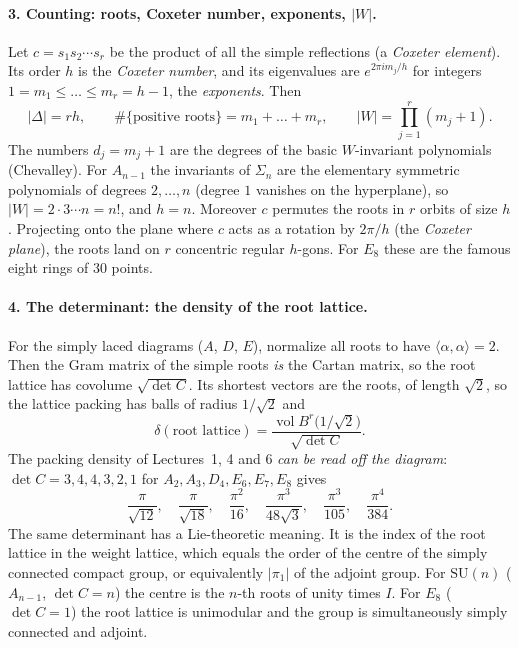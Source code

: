 \documentclass[11pt,openany]{book}
\theoremstyle{plain}
\theoremstyle{definition}
\theoremstyle{remark}
\newcommand{\vol}{\operatorname{vol}}
\newcommand{\abs}[1]{\left\lvert #1 \right\rvert}
\newcommand{\ip}[2]{\langle #1, #2\rangle}
\newcommand{\dens}{\delta}             %
\newcommand{\Ball}{B}                  %
\begin{document}
\paragraph{3. Counting: roots, Coxeter number, exponents, $\abs{W}$.} Let $c=s_1s_2\cdots s_r$ be the
product of all the simple reflections (a \emph{Coxeter element}). Its order $h$ is the \emph{Coxeter
number}, and its eigenvalues are $e^{2\pi im_j/h}$ for integers $1=m_1\le\dots\le m_r=h-1$, the
\emph{exponents}. Then
\[
  \abs{\Delta}=rh,\qquad \#\{\text{positive roots}\}=m_1+\dots+m_r,\qquad
  \abs{W}=\prod_{j=1}^r(m_j+1).
\]
The numbers $d_j=m_j+1$ are the degrees of the basic $W$-invariant polynomials (Chevalley). For
$A_{n-1}$ the invariants of $\Sigma_n$ are the elementary symmetric polynomials of degrees $2,\dots,n$
(degree $1$ vanishes on the hyperplane), so $\abs{W}=2\cdot3\cdots n=n!$, and $h=n$. Moreover $c$
permutes the roots in $r$ orbits of size $h$. Projecting onto the plane where $c$ acts as a rotation
by $2\pi/h$ (the \emph{Coxeter plane}), the roots land on $r$ concentric regular $h$-gons. For $E_8$
these are the famous eight rings of $30$ points.

\paragraph{4. The determinant: the density of the root lattice.} For the simply laced diagrams
($A$, $D$, $E$), normalize all roots to have $\ip{\alpha}{\alpha}=2$. Then the Gram matrix of the simple
roots \emph{is} the Cartan matrix, so the root lattice has covolume $\sqrt{\det C}$. Its shortest
vectors are the roots, of length $\sqrt2$, so the lattice packing has balls of radius $1/\sqrt2$ and
\[
  \dens(\text{root lattice})=\frac{\vol\Ball^r\big(1/\sqrt2\big)}{\sqrt{\det C}}.
\]
The packing density of Lectures~1, 4 and 6 \emph{can be read off the diagram}: $\det C=3,4,4,3,2,1$ for
$A_2,A_3,D_4,E_6,E_7,E_8$ gives
\[
  \frac{\pi}{\sqrt{12}},\quad \frac{\pi}{\sqrt{18}},\quad \frac{\pi^2}{16},\quad
  \frac{\pi^3}{48\sqrt3},\quad \frac{\pi^3}{105},\quad \frac{\pi^4}{384}.
\]
The same determinant has a Lie-theoretic meaning. It is the index of the root lattice in the weight
lattice, which equals the order of the centre of the simply connected compact group, or equivalently
$\abs{\pi_1}$ of the adjoint group. For $\mathrm{SU}(n)$ ($A_{n-1}$, $\det C=n$) the centre is the $n$-th
roots of unity times $I$. For $E_8$ ($\det C=1$) the root lattice is unimodular and the group is
simultaneously simply connected and adjoint.
\end{document}
